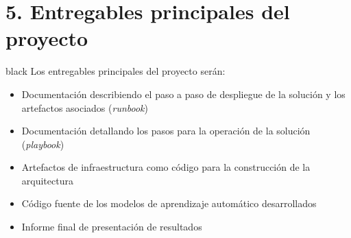 \documentclass[11pt]{charter}
\begin{document}
\section{5. Entregables principales del proyecto}
\label{sec:entregables}

\begin{consigna}{black}
Los entregables principales del proyecto serán: 
\begin{itemize}
\item Documentación describiendo el paso a paso de despliegue de la solución y los artefactos asociados (\textit{runbook})
\item Documentación detallando los pasos para la operación de la solución (\textit{playbook})
\item Artefactos de infraestructura como código para la construcción de la arquitectura
\item Código fuente de los modelos de aprendizaje automático desarrollados
\item Informe final de presentación de resultados

\end{itemize}

\end{consigna}
\end{document}
